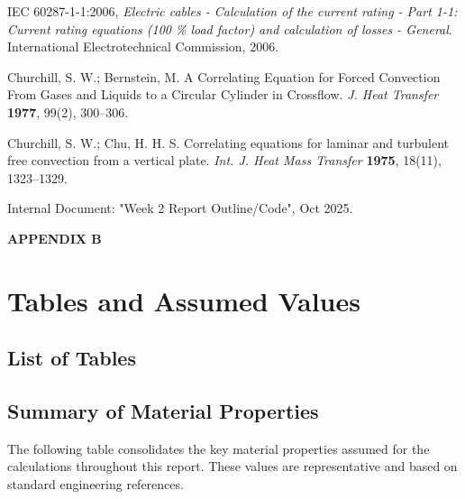 \documentclass[12pt, a4paper]{article}
\begin{document}
\begin{enumerate}
IEC 60287-1-1:2006, \textit{Electric cables - Calculation of the current rating - Part 1-1: Current rating equations (100 \% load factor) and calculation of losses - General}. International Electrotechnical Commission, 2006.

Churchill, S. W.; Bernstein, M. A Correlating Equation for Forced Convection From Gases and Liquids to a Circular Cylinder in Crossflow. \textit{J. Heat Transfer} \textbf{1977}, 99(2), 300–306.

Churchill, S. W.; Chu, H. H. S. Correlating equations for laminar and turbulent free convection from a vertical plate. \textit{Int. J. Heat Mass Transfer} \textbf{1975}, 18(11), 1323–1329.

Internal Document: "Week 2 Report Outline/Code", Oct 2025.

\end{enumerate}
    
\newpage
\begin{center}\textbf{APPENDIX B}\end{center}
\section{Tables and Assumed Values}
\subsection{List of Tables}
\listoftables
{}

\subsection{Summary of Material Properties}
The following table consolidates the key material properties assumed for the calculations throughout this report. These values are representative and based on standard engineering references.
\end{document}
